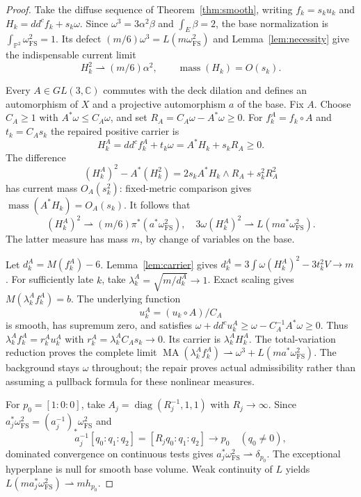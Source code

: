 \documentclass[11pt]{article}
\newcommand{\ddc}{dd^c}
\newcommand{\MA}{\operatorname{MA}}
\begin{document}
\begin{proof}
Take the diffuse sequence of Theorem~\ref{thm:smooth}, writing
$f_k=s_ku_k$ and $H_k=\ddc f_k+s_k\omega$.
Since $\omega^3=3\alpha^2\beta$ and $\int_E\beta=2$, the base
normalization is $\int_{\mathbb P^2}\omega_{\mathrm{FS}}^2=1$.
Its defect $(m/6)\omega^3=L(m\omega_{\mathrm{FS}}^2)$ and
Lemma~\ref{lem:necessity} give the indispensable current limit
\[
 H_k^2\rightharpoonup(m/6)\alpha^2,
 \qquad \operatorname{mass}(H_k)=O(s_k).
\]

Every $A\in GL(3,\mathbb C)$ commutes with the deck dilation and
defines an automorphism of $X$ and a projective automorphism $a$
of the base. Fix $A$. Choose $C_A\geq1$ with
$A^*\omega\leq C_A\omega$, and set
$R_A=C_A\omega-A^*\omega\geq0$.
For $f_k^A=f_k\circ A$ and $t_k=C_As_k$ the repaired positive
carrier is
\[
 H_k^A=\ddc f_k^A+t_k\omega=A^*H_k+s_kR_A\geq0.
\]
The difference
\[
 (H_k^A)^2-A^*(H_k^2)
        =2s_kA^*H_k\wedge R_A+s_k^2R_A^2
\]
has current mass $O_A(s_k^2)$: fixed-metric comparison gives
$\operatorname{mass}(A^*H_k)=O_A(s_k)$.
It follows that
\[
 (H_k^A)^2\rightharpoonup(m/6)\pi^*(a^*\omega_{\mathrm{FS}}^2),
 \quad
 3\omega(H_k^A)^2\rightharpoonup L(m a^*\omega_{\mathrm{FS}}^2).
\]
The latter measure has mass $m$, by change of variables on the base.

Let $d_k^A=M(f_k^A)-6$. Lemma~\ref{lem:carrier} gives
$d_k^A=3\int\omega(H_k^A)^2-3t_k^2V\to m$.
For sufficiently late $k$, take
$\lambda_k^A=\sqrt{m/d_k^A}\to1$. Exact scaling gives
$M(\lambda_k^Af_k^A)=b$. The underlying function
\[
 u_k^A=(u_k\circ A)/C_A
\]
is smooth, has supremum zero, and satisfies
$\omega+\ddc u_k^A\geq\omega-C_A^{-1}A^*\omega\geq0$.
Thus $\lambda_k^Af_k^A=r_k^Au_k^A$ with
$r_k^A=\lambda_k^AC_As_k\to0$. Its carrier is
$\lambda_k^AH_k^A$. The total-variation reduction proves the complete
limit $\MA(\lambda_k^Af_k^A)\rightharpoonup
\omega^3+L(m a^*\omega_{\mathrm{FS}}^2)$.
The background stays $\omega$ throughout; the repair proves actual
admissibility rather than assuming a pullback formula for these
nonlinear measures.

For $p_0=[1:0:0]$, take
$A_j=\operatorname{diag}(R_j^{-1},1,1)$ with $R_j\to\infty$.
Since
$a_j^*\omega_{\mathrm{FS}}^2=(a_j^{-1})_*\omega_{\mathrm{FS}}^2$
and
\[
 a_j^{-1}[q_0:q_1:q_2]=[R_jq_0:q_1:q_2]\longrightarrow p_0
       \quad(q_0\ne0),
\]
dominated convergence on continuous tests gives
$a_j^*\omega_{\mathrm{FS}}^2\rightharpoonup\delta_{p_0}$.
The exceptional hyperplane is null for smooth base volume.
Weak continuity of $L$ yields
$L(m a_j^*\omega_{\mathrm{FS}}^2)\rightharpoonup mh_{p_0}$.


\end{proof}
\end{document}
